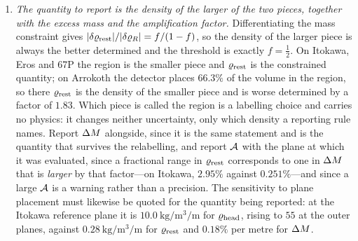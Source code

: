 \begin{enumerate}
\item \emph{The quantity to report is the density of the larger of the two
pieces, together with the excess mass and the amplification factor.}
Differentiating the mass constraint gives
$\lvert\delta\varrho_{\mathrm{rest}}\rvert/\lvert\delta\varrho_{R}\rvert = f/(1-f)$, so the
density of the larger piece is always the better determined and the
threshold is exactly $f = \tfrac{1}{2}$. On Itokawa, Eros and 67P the
region is the smaller piece and $\varrho_{\mathrm{rest}}$ is the constrained quantity;
on Arrokoth the detector places $66.3\%$ of the volume in the region, so
there $\varrho_{\mathrm{rest}}$ is the density of the smaller piece and is worse
determined by a factor of $1.83$. Which piece is called the region is a
labelling choice and carries no physics: it changes neither uncertainty,
only which density a reporting rule names. Report $\Delta M$ alongside,
since it is the same statement and is the quantity that survives the
relabelling, and report $\mathcal{A}$ with the plane at which it was
evaluated, since a fractional range in $\varrho_{\mathrm{rest}}$ corresponds to one in
$\Delta M$ that is \emph{larger} by that factor---on Itokawa, $2.95\%$
against $0.251\%$---and since a large $\mathcal{A}$ is a warning rather than a
precision. The sensitivity to plane placement must likewise be quoted for
the quantity being reported: at the Itokawa reference plane it is
$\SI{10.0}{\kilo\gram\per\cubic\metre\per\metre}$ for $\varrho_{\mathrm{head}}$, rising
to $55$ at the outer planes, against
$\SI{0.28}{\kilo\gram\per\cubic\metre\per\metre}$ for $\varrho_{\mathrm{rest}}$ and
$0.18\%$ per metre for $\Delta M$.


\end{enumerate}
